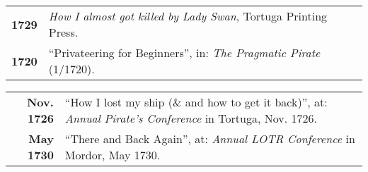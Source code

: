 \documentclass[blue]{pastelcv}
\begin{document}
\begin{paracol}{2}
\begin{tabular}{>{\footnotesize\bfseries}r >{\footnotesize}p{}}
    1729 & \emph{How I almost got killed by Lady Swan}, Tortuga Printing Press. \\
    1720 & ``Privateering for Beginners'', in: \emph{The Pragmatic Pirate} (1/1720).
\end{tabular}
\smallskip

\begin{tabular}{>{\footnotesize\bfseries}r >{\footnotesize}p{\onethirdwidth}}
    Nov. 1726 & ``How I lost my ship (\& and how to get it back)'', at: \emph{Annual Pirate's Conference} in Tortuga, Nov. 1726. \\
    May 1730 & ``There and Back Again'', at: \emph{Annual LOTR Conference} in Mordor, May 1730.
\end{tabular}


\end{paracol}
\end{document}
